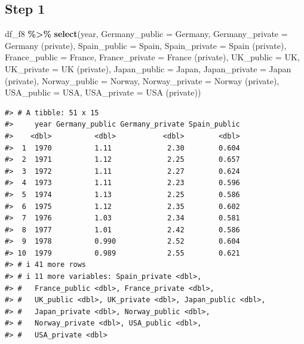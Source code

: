 \documentclass[
  xelatex, ja=standard]{bxjsbook}
\newenvironment{Shaded}{\begin{snugshade}}{\end{snugshade}}
\newcommand{\AttributeTok}[1]{\textcolor[rgb]{0.13,0.29,0.53}{#1}}
\newcommand{\FunctionTok}[1]{\textcolor[rgb]{0.13,0.29,0.53}{\textbf{#1}}}
\newcommand{\NormalTok}[1]{#1}
\newcommand{\SpecialCharTok}[1]{\textcolor[rgb]{0.81,0.36,0.00}{\textbf{#1}}}
\newcommand{\StringTok}[1]{\textcolor[rgb]{0.31,0.60,0.02}{#1}}
\theoremstyle{definition}
\theoremstyle{definition}
\theoremstyle{definition}
\theoremstyle{definition}
\theoremstyle{remark}
\begin{document}
\hypertarget{step-1}{%
\subsection{Step 1}\label{step-1}}

\begin{Shaded}
\begin{Highlighting}[]
\NormalTok{df\_f8 }\SpecialCharTok{\%\textgreater{}\%} 
  \FunctionTok{select}\NormalTok{(year, }\AttributeTok{Germany\_public =}\NormalTok{ Germany, }\AttributeTok{Germany\_private =} \StringTok{\textquotesingle{}Germany (private)\textquotesingle{}}\NormalTok{, }
         \AttributeTok{Spain\_public =}\NormalTok{ Spain, }\AttributeTok{Spain\_private =} \StringTok{\textquotesingle{}Spain (private)\textquotesingle{}}\NormalTok{, }
         \AttributeTok{France\_public =}\NormalTok{ France, }\AttributeTok{France\_private =} \StringTok{\textquotesingle{}France (private)\textquotesingle{}}\NormalTok{, }
         \AttributeTok{UK\_public  =}\NormalTok{ UK, }\AttributeTok{UK\_private =} \StringTok{\textquotesingle{}UK (private)\textquotesingle{}}\NormalTok{, }
         \AttributeTok{Japan\_public =}\NormalTok{ Japan, }\AttributeTok{Japan\_private =} \StringTok{\textquotesingle{}Japan (private)\textquotesingle{}}\NormalTok{, }
         \AttributeTok{Norway\_public =}\NormalTok{ Norway, }\AttributeTok{Norway\_private =} \StringTok{\textquotesingle{}Norway (private)\textquotesingle{}}\NormalTok{,}
         \AttributeTok{USA\_public =}\NormalTok{ USA, }\AttributeTok{USA\_private =} \StringTok{\textquotesingle{}USA (private)\textquotesingle{}}\NormalTok{) }
\end{Highlighting}
\end{Shaded}

\begin{verbatim}
#> # A tibble: 51 x 15
#>     year Germany_public Germany_private Spain_public
#>    <dbl>          <dbl>           <dbl>        <dbl>
#>  1  1970          1.11             2.30        0.604
#>  2  1971          1.12             2.25        0.657
#>  3  1972          1.11             2.27        0.624
#>  4  1973          1.11             2.23        0.596
#>  5  1974          1.13             2.25        0.586
#>  6  1975          1.12             2.35        0.602
#>  7  1976          1.03             2.34        0.581
#>  8  1977          1.01             2.42        0.586
#>  9  1978          0.990            2.52        0.604
#> 10  1979          0.989            2.55        0.621
#> # i 41 more rows
#> # i 11 more variables: Spain_private <dbl>,
#> #   France_public <dbl>, France_private <dbl>,
#> #   UK_public <dbl>, UK_private <dbl>, Japan_public <dbl>,
#> #   Japan_private <dbl>, Norway_public <dbl>,
#> #   Norway_private <dbl>, USA_public <dbl>,
#> #   USA_private <dbl>
\end{verbatim}
\end{document}

